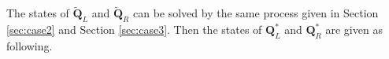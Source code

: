 \documentclass[review]{elsarticle}
\begin{document}
%
The states of $\widetilde{\mathbf{Q}}_L$ and   $\widetilde{\mathbf{Q}}_R$ can be solved by  the same process  given in  Section \ref{sec:case2} and Section \ref{sec:case3}. Then the states of $\mathbf{Q}^*_L$ and $\mathbf{Q}^*_R$ are given as following.
\end{document}
